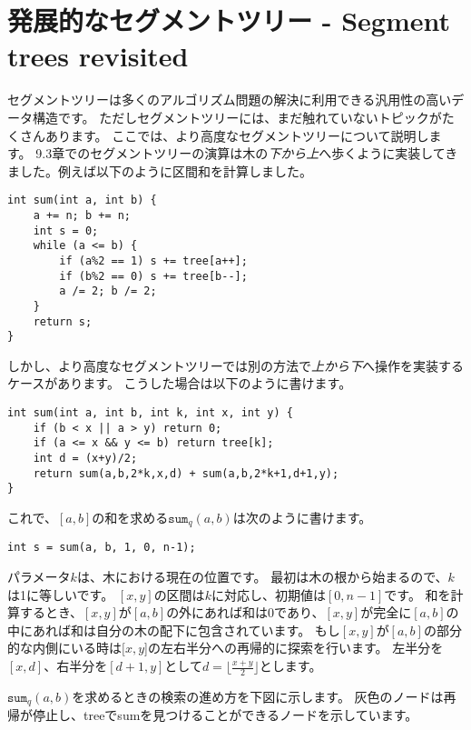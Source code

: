 \chapter{発展的なセグメントツリー - Segment trees revisited}


セグメントツリーは多くのアルゴリズム問題の解決に利用できる汎用性の高いデータ構造です。
ただしセグメントツリーには、まだ触れていないトピックがたくさんあります。
ここでは、より高度なセグメントツリーについて説明します。
9.3章でのセグメントツリーの演算は木の\emph{下から上}へ歩くように実装してきました。例えば以下のように区間和を計算しました。

\begin{lstlisting}
int sum(int a, int b) {
    a += n; b += n;
    int s = 0;
    while (a <= b) {
        if (a%2 == 1) s += tree[a++];
        if (b%2 == 0) s += tree[b--];
        a /= 2; b /= 2;
    }
    return s;
}
\end{lstlisting}

しかし、より高度なセグメントツリーでは別の方法で\emph{上から下}へ操作を実装するケースがあります。
こうした場合は以下のように書けます。
\begin{lstlisting}
int sum(int a, int b, int k, int x, int y) {
    if (b < x || a > y) return 0;
    if (a <= x && y <= b) return tree[k];
    int d = (x+y)/2;
    return sum(a,b,2*k,x,d) + sum(a,b,2*k+1,d+1,y);
}
\end{lstlisting}

これで、$[a,b]$の和を求める$\texttt{sum}_q(a,b)$は次のように書けます。
\begin{lstlisting}
int s = sum(a, b, 1, 0, n-1);
\end{lstlisting}

パラメータ$k$は、木における現在の位置です。
最初は木の根から始まるので、$k$は1に等しいです。
$[x,y]$の区間は$k$に対応し、初期値は$[0, n - 1]$です。
和を計算するとき、$[x, y]$が$[a, b]$の外にあれば和は0であり、$[x, y]$が完全に$[a, b]$の中にあれば和は自分の木の配下に包含されています。
もし$[x, y]$が$[a, b]$の部分的な内側にいる時は$[x, y$]の左右半分への再帰的に探索を行います。
左半分を$[x, d]$、右半分を$[d + 1, y]$として$d=\lfloor \frac{x+y}{2} \rfloor$とします。

$\texttt{sum}_q(a,b)$を求めるときの検索の進め方を下図に示します。
灰色のノードは再帰が停止し、treeでsumを見つけることができるノードを示しています。

